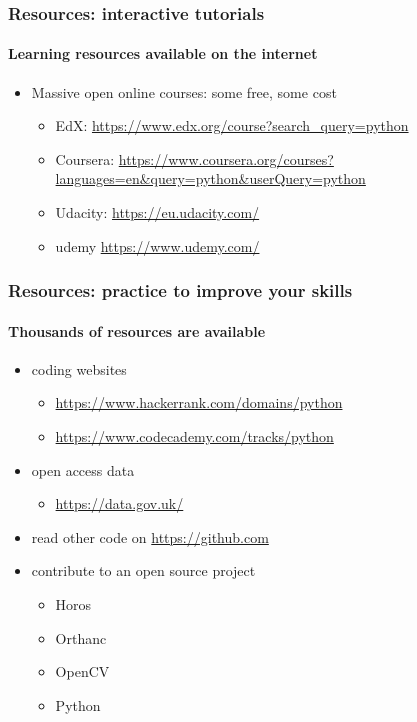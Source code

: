 \documentclass{beamer}
\begin{document}
    \begin{frame}
	    \frametitle{Resources: interactive tutorials}
	    \framesubtitle{Learning resources available on the internet}
	    \begin{itemize}
		    \item Massive open online courses: some free, some cost
			    \begin{itemize}
				    \item EdX: \url{https://www.edx.org/course?search_query=python}
				    \item Coursera: \url{https://www.coursera.org/courses?languages=en&query=python&userQuery=python}
				    \item Udacity: \url{https://eu.udacity.com/}
				    \item udemy \url{https://www.udemy.com/}
			    \end{itemize}
	    \end{itemize}
    \end{frame}

    \begin{frame}
	    \frametitle{Resources: practice to improve your skills}
	    \framesubtitle{Thousands of resources are available}
	    \begin{itemize}
		    \item coding websites
			    \begin{itemize}
				    \item \url{https://www.hackerrank.com/domains/python}
				    \item \url{https://www.codecademy.com/tracks/python}
			    \end{itemize}
		    \item open access data
			    \begin{itemize}
				    \item \url{https://data.gov.uk/}
			    \end{itemize}
		    \item read other code on \url{https://github.com}
		    \item contribute to an open source project
			    \begin{itemize}
				    \item Horos
				    \item Orthanc
				    \item OpenCV
				    \item Python
			    \end{itemize}
	    \end{itemize}
    \end{frame}
\end{document}
